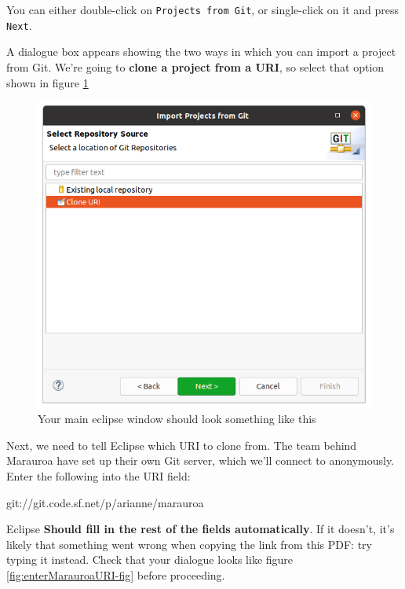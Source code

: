\documentclass[
]{book}
\newenvironment{Shaded}{\begin{snugshade}}{\end{snugshade}}
\newcommand{\NormalTok}[1]{#1}
\begin{document}
You can either double-click on \texttt{Projects\ from\ Git}, or single-click on it and press \texttt{Next}.

A dialogue box appears showing the two ways in which you can import a project from Git. We're going to \textbf{clone a project from a URI}, so select that option shown in figure \ref{fig:eclipseCloneFromURI-fig}

\begin{figure}

{\centering \includegraphics[width=1\linewidth]{images/1.4.eclipseCloneFromURI} 

}

\caption{Your main eclipse window should look something like this}\label{fig:eclipseCloneFromURI-fig}
\end{figure}

Next, we need to tell Eclipse which URI to clone from. The team behind Marauroa have set up their own Git server, which we'll connect to anonymously. Enter the following into the URI field:

\begin{Shaded}
\begin{Highlighting}[]
\NormalTok{git://git.code.sf.net/p/arianne/marauroa}
\end{Highlighting}
\end{Shaded}

Eclipse \textbf{Should fill in the rest of the fields automatically}. If it doesn't, it's likely that something went wrong when copying the link from this PDF: try typing it instead. Check that your dialogue looks like figure \ref{fig:enterMarauroaURI-fig} before proceeding.
\end{document}
